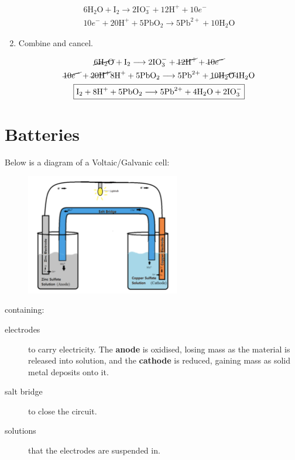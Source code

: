 \documentclass[a4paper, 12pt]{article}
\begin{document}
\begin{enumerate}[leftmargin=*]
\begin{gather*}
6\text{H$_2$O} + \text{I}_2 \longrightarrow 2\text{IO}_3^- + 12\text{H}^+ + 10e^-\\
10e^- + 20\text{H}^+ + 5\text{PbO}_2 \longrightarrow 5\text{Pb}^{2+} + 10\text{H$_2$O}
\end{gather*}

\item Combine and cancel.

\begin{gather*}
\cancel{6\text{H$_2$O}} + \text{I}_2 \longrightarrow 2\text{IO}_3^- + \cancel{12\text{H}^+} + \cancel{10e^-}\\
\cancel{10e^-} + \cancel{20\text{H}^+} 8\text{H}^+ + 5\text{PbO}_2 \longrightarrow 5\text{Pb}^{2+} + \cancel{10\text{H$_2$O}} 4\text{H$_2$O} \\
\boxed{\text{I}_2 + 8\text{H}^+ + 5\text{PbO}_2 \longrightarrow 5\text{Pb}^{2+} + 4\text{H$_2$O} + 2\text{IO}_3^-}
\end{gather*}

\end{enumerate}

\section{Batteries}
Below is a diagram of a Voltaic/Galvanic cell:
\begin{figure}[H]
\centering
\includegraphics[width=0.6\textwidth]{voltaiccell}
\end{figure}

containing:

\begin{description}
\item[electrodes] to carry electricity. The \textbf{anode} is oxidised, losing mass as the material is released into solution, and the \textbf{cathode} is reduced, gaining mass as solid metal deposits onto it.
\item[salt bridge] to close the circuit. 
\item[solutions] that the electrodes are suspended in. 
\end{description}
\end{document}
